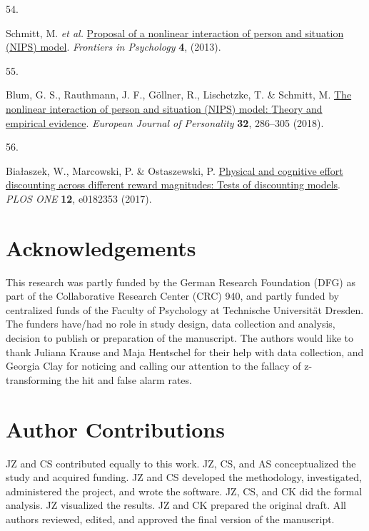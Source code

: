 \documentclass[
  man,floatsintext]{apa6}
\newlength{\cslhangindent}
\newlength{\csllabelwidth}
\newlength{\cslentryspacingunit} %
\newenvironment{CSLReferences}[2] %
 {%
  \setlength{\parindent}{0pt}
  \ifodd #1
  \let\oldpar\par
  \def\par{\hangindent=\cslhangindent\oldpar}
  \fi
  \setlength{\parskip}{#2\cslentryspacingunit}
 }%
 {}
\newcommand{\CSLLeftMargin}[1]{\parbox[t]{\csllabelwidth}{#1}}
\newcommand{\CSLRightInline}[1]{\parbox[t]{\linewidth - \csllabelwidth}{#1}\break}
\begin{document}
\begin{CSLReferences}{0}{0}
\leavevmode{}%
\CSLLeftMargin{54. }%
\CSLRightInline{Schmitt, M. \emph{et al.} \href{https://doi.org/10.3389/fpsyg.2013.00499}{Proposal of a nonlinear interaction of person and situation ({NIPS}) model}. \emph{Frontiers in Psychology} \textbf{4}, (2013).}

\leavevmode{}%
\CSLLeftMargin{55. }%
\CSLRightInline{Blum, G. S., Rauthmann, J. F., Göllner, R., Lischetzke, T. \& Schmitt, M. \href{https://doi.org/10.1002/per.2138}{The nonlinear interaction of person and situation ({NIPS)} model: {Theory} and empirical evidence}. \emph{European Journal of Personality} \textbf{32}, 286--305 (2018).}

\leavevmode{}%
\CSLLeftMargin{56. }%
\CSLRightInline{Białaszek, W., Marcowski, P. \& Ostaszewski, P. \href{https://doi.org/10.1371/journal.pone.0182353}{Physical and cognitive effort discounting across different reward magnitudes: Tests of discounting models}. \emph{{PLOS} {ONE}} \textbf{12}, e0182353 (2017).}

\end{CSLReferences}

\endgroup

\newpage

\hypertarget{acknowledgements}{%
\section{Acknowledgements}\label{acknowledgements}}

This research was partly funded by the German Research Foundation (DFG) as part of the Collaborative Research Center (CRC) 940, and partly funded by centralized funds of the Faculty of Psychology at Technische Universität Dresden.
The funders have/had no role in study design, data collection and analysis, decision to publish or preparation of the manuscript.
The authors would like to thank Juliana Krause and Maja Hentschel for their help with data collection, and Georgia Clay for noticing and calling our attention to the fallacy of z-transforming the hit and false alarm rates.

\hypertarget{author-contributions}{%
\section{Author Contributions}\label{author-contributions}}

JZ and CS contributed equally to this work.
JZ, CS, and AS conceptualized the study and acquired funding.
JZ and CS developed the methodology, investigated, administered the project, and wrote the software.
JZ, CS, and CK did the formal analysis.
JZ visualized the results.
JZ and CK prepared the original draft.
All authors reviewed, edited, and approved the final version of the manuscript.
\end{document}
